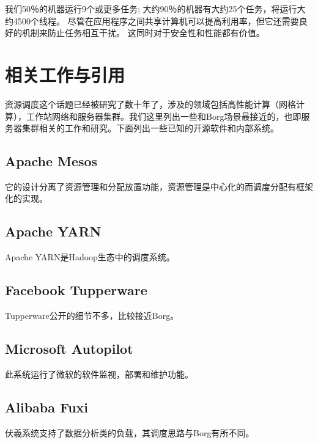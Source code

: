 我们50％的机器运行9个或更多任务; 大约90％的机器有大约25个任务，将运行大约4500个线程。 尽管在应用程序之间共享计算机可以提高利用率，但它还需要良好的机制来防止任务相互干扰。 这同时对于安全性和性能都有价值。

\section{相关工作与引用}

资源调度这个话题已经被研究了数十年了，涉及的领域包括高性能计算（网格计算），工作站网络和服务器集群。我们这里列出一些和Borg场景最接近的，也即服务器集群相关的工作和研究。下面列出一些已知的开源软件和内部系统。

\subsection{Apache Mesos}

它的设计分离了资源管理和分配放置功能，资源管理是中心化的而调度分配有框架化的实现。

\subsection{Apache YARN}

Apache YARN是Hadoop生态中的调度系统。

\subsection{Facebook Tupperware}

Tupperware公开的细节不多，比较接近Borg。

\subsection{Microsoft Autopilot}

此系统运行了微软的软件监视，部署和维护功能。

\subsection{Alibaba Fuxi}

伏羲系统支持了数据分析类的负载，其调度思路与Borg有所不同。 
